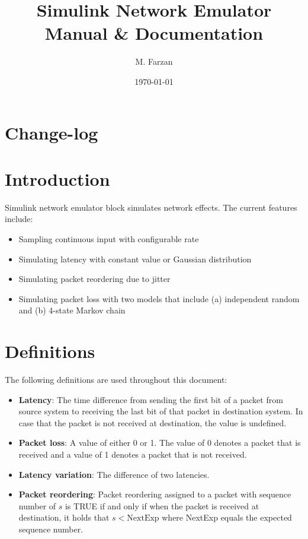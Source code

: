 \documentclass[a4paper, 11pt]{article}
\title{Simulink Network Emulator \\ {Manual \& Documentation}}
\author{M. Farzan}
\date{\today}
\begin{document}
\maketitle
\section*{Change-log}

\tableofcontents
\newpage
\section{Introduction}
Simulink network emulator block simulates network effects. The current features include:
\begin{itemize}
\item Sampling continuous input with configurable rate
\item Simulating latency with constant value or Gaussian distribution
\item Simulating packet reordering due to jitter
\item Simulating packet loss with two models that include (a) independent random and (b) 4-state Markov chain
\end{itemize}

\section{Definitions}
The following definitions are used throughout this document:
\begin{itemize}
\item[] \textbf{Latency}: The time difference from sending the first bit of a packet from source system to receiving the last bit of that packet in destination system. In case that the packet is not received at destination, the value is undefined. \cite{rfc7679}
\item[] \textbf{Packet loss}: A value of either 0 or 1. The value of 0 denotes a packet that is received and a value of 1 denotes a packet that is not received. \cite{rfc7680}
\item[] \textbf{Latency variation}: The difference of two latencies. \cite{rfc3393}
\item[] \textbf{Packet reordering}: Packet reordering assigned to a packet with sequence number of $s$ is TRUE if and only if when the packet is received at destination, it holds that $s<\textrm{NextExp}$ where NextExp equals the expected sequence number. \cite{rfc4737}
\end{itemize}
\end{document}
